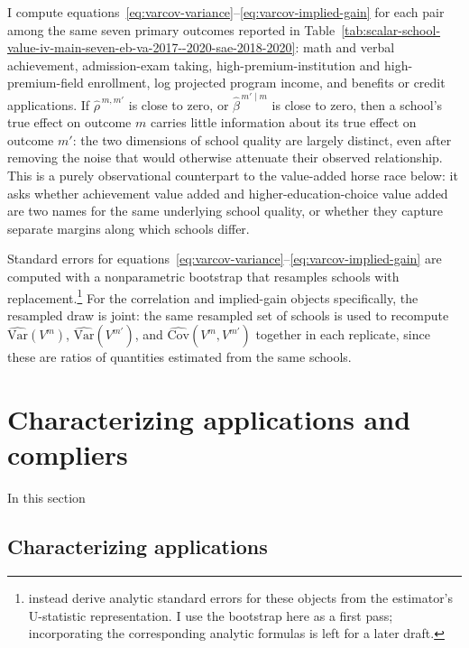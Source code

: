 \documentclass[a4paper, article, english, oneside, unknownkeysallowed, 12pt]{memoir}
\begin{document}
I compute equations~\eqref{eq:varcov-variance}--\eqref{eq:varcov-implied-gain} for each pair among the same seven primary outcomes reported in Table~\ref{tab:scalar-school-value-iv-main-seven-eb-va-2017--2020-sae-2018-2020}: math and verbal achievement, admission-exam taking, high-premium-institution and high-premium-field enrollment, log projected program income, and benefits or credit applications.
If $\widehat\rho^{\,m,m'}$ is close to zero, or $\widehat\beta^{\,m'\mid m}$ is close to zero, then a school's true effect on outcome $m$ carries little information about its true effect on outcome $m'$: the two dimensions of school quality are largely distinct, even after removing the noise that would otherwise attenuate their observed relationship.
This is a purely observational counterpart to the value-added horse race below: it asks whether achievement value added and higher-education-choice value added are two names for the same underlying school quality, or whether they capture separate margins along which schools differ.

Standard errors for equations~\eqref{eq:varcov-variance}--\eqref{eq:varcov-implied-gain} are computed with a nonparametric bootstrap that resamples schools with replacement.\footnote{\textcite{rose_effects_2022} instead derive analytic standard errors for these objects from the estimator's U-statistic representation. I use the bootstrap here as a first pass; incorporating the corresponding analytic formulas is left for a later draft.}
For the correlation and implied-gain objects specifically, the resampled draw is joint: the same resampled set of schools is used to recompute $\widehat{\mathrm{Var}}(V^m)$, $\widehat{\mathrm{Var}}(V^{m'})$, and $\widehat{\mathrm{Cov}}(V^m,V^{m'})$ together in each replicate, since these are ratios of quantities estimated from the same schools.

\clearpage

\section{Characterizing applications and compliers}

In this section 


\subsection{Characterizing applications}
\end{document}
